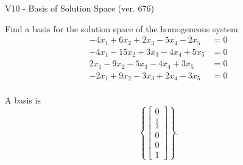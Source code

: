 \begin{exercise}
  \begin{exerciseTitle}V10 - Basis of Solution Space (ver. 676)\end{exerciseTitle}
  \begin{exerciseStatement}
    Find a basis for the solution space of the homogeneous system 
\begin{align*}
 -4 x_ 1 + 6 x_ 2 + 2 x_ 3 -5 x_ 4 -2 x_ 5 &= 0  \\ 
  -4 x_ 1 -15 x_ 2 + 3 x_ 3 -4 x_ 4 + 5 x_ 5 &= 0  \\ 
  2 x_ 1 -9 x_ 2 -5 x_ 3 -4 x_ 4 + 3 x_ 5 &= 0  \\ 
  -2 x_ 1 + 9 x_ 2 -3 x_ 3 + 2 x_ 4 -3 x_ 5 &= 0  \\ 
 \end{align*}


 
  \end{exerciseStatement}

  \begin{exerciseAnswer}
   A basis is   
\[\left\{\left[\begin{array}{c}
0 \\
\frac{1}{3} \\
0 \\
0 \\
1
\end{array}\right]\right\}.\]

  


  \end{exerciseAnswer}
\end{exercise}
